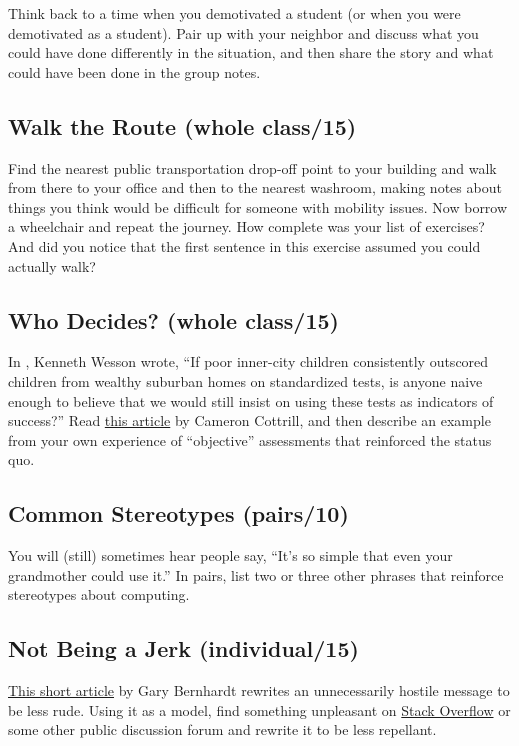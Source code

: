 Think back to a time when you demotivated a student (or when you were
demotivated as a student). Pair up with your neighbor and discuss what
you could have done differently in the situation, and then share the
story and what could have been done in the group notes.

\subsection*{Walk the Route (whole class/15)}

Find the nearest public transportation drop-off point to your building
and walk from there to your office and then to the nearest washroom,
making notes about things you think would be difficult for someone with
mobility issues. Now borrow a wheelchair and repeat the journey. How
complete was your list of exercises? And did you notice that the first
sentence in this exercise assumed you could actually walk?

\subsection*{Who Decides? (whole class/15)}

In \cite{Litt2004}, Kenneth Wesson wrote, ``If poor inner-city
children consistently outscored children from wealthy suburban homes
on standardized tests, is anyone naive enough to believe that we would
still insist on using these tests as indicators of success?'' Read
\href{https://mobile.nytimes.com/2016/04/10/upshot/why-talented-black-and-hispanic-students-can-go-undiscovered.html}{this article} by Cameron Cottrill, and then
describe an example from your own experience of ``objective''
assessments that reinforced the status quo.

\subsection*{Common Stereotypes (pairs/10)}

You will (still) sometimes hear people say, ``It's so simple that even
your grandmother could use it.'' In pairs, list two or three other
phrases that reinforce stereotypes about computing.

\subsection*{Not Being a Jerk (individual/15)}

\href{https://www.destroyallsoftware.com/blog/2018/a-case-study-in-not-being-a-jerk-in-open-source}{This short article} by Gary Bernhardt rewrites an
unnecessarily hostile message to be less rude. Using it as a model,
find something unpleasant on \href{https://stackoverflow.com/}{Stack Overflow} or some
other public discussion forum and rewrite it to be less repellant.

